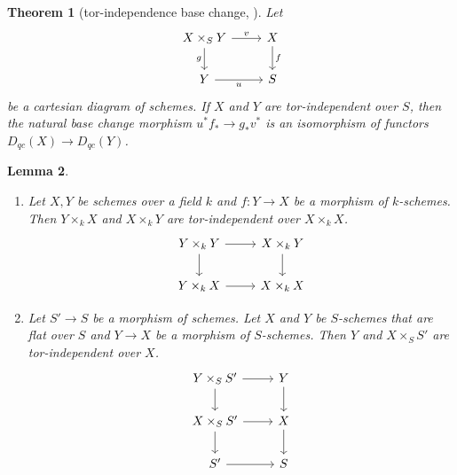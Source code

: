 \documentclass{amsart}
\numberwithin{equation}{section}
\theoremstyle{plain}
\newtheorem{theorem}{Theorem}[section]
\newtheorem{lemma}[theorem]{Lemma}
\theoremstyle{definition}
\begin{document}
\begin{theorem}[tor-independence base change, {\cite[\href{https://stacks.math.columbia.edu/tag/08IB}{Tag 08IB}]{stacks-project}}]
    Let
    \[
        \begin{tikzcd}
            X \times_S Y \arrow[r,"v"]\arrow[d, "g"'] & X \arrow[d,"f"]\\
            Y \arrow[r, "u"']& S
        \end{tikzcd}
    \]
    be a cartesian diagram of schemes.
    If $X$ and $Y$ are tor-independent over $S$, then the natural base change morphism $u^*f_* \to g_*v^*$ is an isomorphism of functors $D_{qc}(X) \to D_{qc}(Y)$.
\end{theorem}

\begin{lemma}
    \begin{enumerate}\label{lem:tor-independent-situations}
        \item Let $X, Y$ be schemes over a field $k$ and $f \colon Y \to X$ be a morphism of $k$-schemes. Then $Y \times_k X$ and $X \times_k Y$ are tor-independent over $X \times_k X$.
              \[
                  \begin{tikzcd}
                      Y \times_k Y \arrow[r]\arrow[d] & X \times_k Y \arrow[d]\\
                      Y \times_k X \arrow[r]&  X \times_k X
                  \end{tikzcd}
              \]

        \item Let $S' \to S$ be a morphism of schemes. Let $X$ and $Y$ be $S$-schemes that are flat over $S$ and $Y \to X$ be a morphism of $S$-schemes. Then $Y$ and $X \times_S S'$ are tor-independent over $X$.
              \[
                  \begin{tikzcd}
                      Y \times_S S' \arrow[r]\arrow[d] & Y \arrow[d]\\
                      X \times_S S' \arrow[r]\arrow[d] & X \arrow[d]\\
                      S' \arrow[r]& S
                  \end{tikzcd}
              \]
    \end{enumerate}
\end{lemma}
\end{document}
